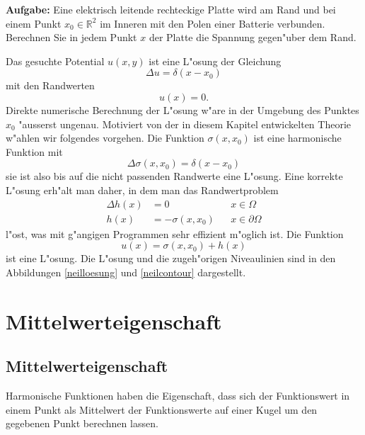 {\parindent 0pt
\medskip
{\bf Aufgabe:} Eine elektrisch leitende rechteckige Platte wird am Rand und bei 
einem Punkt $x_0\in\mathbb R^2$ im Inneren mit den Polen einer Batterie verbunden. Berechnen
Sie in jedem Punkt $x$ der Platte die Spannung gegen"uber dem Rand.

\medskip
}
Das gesuchte Potential $u(x,y)$ ist eine L"osung der Gleichung
\[
\Delta u=\delta(x-x_0)
\]
mit den Randwerten
\[
u(x)=0.
\]
Direkte numerische Berechnung der L"osung w"are in der Umgebung des Punktes
$x_0$ "ausserst ungenau. Motiviert von der in diesem Kapitel entwickelten
Theorie w"ahlen wir folgendes vorgehen. Die Funktion $\sigma(x,x_0)$
ist eine harmonische Funktion mit 
\[
\Delta\sigma(x,x_0)=\delta(x-x_0)
\]
sie ist also bis auf die nicht passenden Randwerte eine L"osung.
Eine korrekte L"osung erh"alt man daher, in dem man das Randwertproblem
\begin{align*}
\Delta h(x)&=0&&x\in\Omega\\
h(x)&=-\sigma(x,x_0)&&x\in\partial\Omega
\end{align*}
l"ost, was mit g"angigen Programmen sehr effizient m"oglich ist.
Die Funktion 
\[
u(x)=\sigma(x,x_0)+h(x)
\]
ist eine L"osung. Die L"osung und die zugeh"origen Niveaulinien
sind in den Abbildungen \ref{neilloesung} und \ref{neilcontour} dargestellt.

\section{Mittelwerteigenschaft}
\subsection{Mittelwerteigenschaft}
Harmonische Funktionen haben die Eigenschaft, dass sich der Funktionswert
in einem Punkt
als Mittelwert der Funktionswerte auf einer Kugel um den gegebenen Punkt
berechnen lassen.

